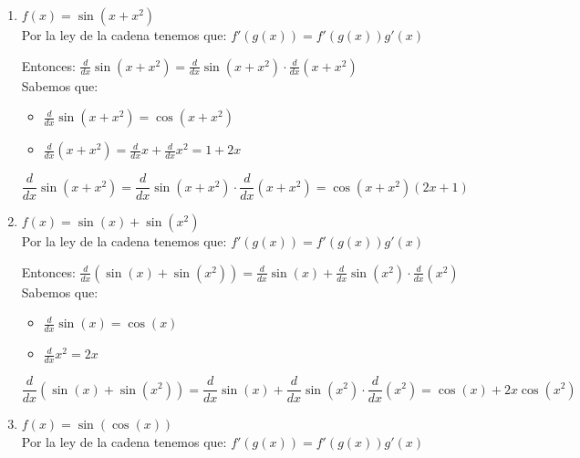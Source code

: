 \documentclass[12pt]{article}
\begin{document}
\begin{enumerate}[\hspace{9px} a)]
    \item \(f(x) = \sin(x+x^2)\)\\

        Por la ley de la cadena tenemos que: \(f'(g(x))=f'(g(x))g'(x)\)\medskip

        Entonces: \quad \(\displaystyle\frac{d}{dx}\sin(x+x^2)=\displaystyle\frac{d}{dx}\sin(x+x^2)\cdot\displaystyle\frac{d}{dx}(x+x^2)\)\\

        Sabemos que:
        \begin{itemize}
            \item \(\displaystyle\frac{d}{dx}\sin(x+x^2)=\cos(x+x^2)\)
            \item \(\displaystyle\frac{d}{dx}(x+x^2)=\frac{d}{dx}x + \frac{d}{dx}x^2=1+2x\)
        \end{itemize}

        \[\displaystyle\frac{d}{dx}\sin(x+x^2)=\displaystyle\frac{d}{dx}\sin(x+x^2)\cdot\displaystyle\frac{d}{dx}(x+x^2)=\cos(x+x^2)(2x+1)\]
    \item \(f(x) = \sin(x) + \sin(x^2)\)\\

        Por la ley de la cadena tenemos que: \(f'(g(x))=f'(g(x))g'(x)\)\medskip

        Entonces: \quad \(\displaystyle\frac{d}{dx}(\sin(x)+\sin(x^2))=\displaystyle\frac{d}{dx}\sin(x)+\frac{d}{dx}\sin(x^2)\cdot\frac{d}{dx}(x^2)\)\\

        Sabemos que:
        \begin{itemize}
            \item \(\displaystyle\frac{d}{dx}\sin(x)=\cos(x)\)
            \item \(\displaystyle\frac{d}{dx}x^2=2x\)
        \end{itemize}

        \begin{equation*}
            \displaystyle\frac{d}{dx}(\sin(x)+\sin(x^2))=\displaystyle\frac{d}{dx}\sin(x)+\frac{d}{dx}\sin(x^2)\cdot\frac{d}{dx}(x^2)=\cos(x)+2x\cos(x^2)
        \end{equation*}
    \item \(f(x) = \sin(\cos(x))\)\\

        Por la ley de la cadena tenemos que: \(f'(g(x))=f'(g(x))g'(x)\)\medskip


\end{enumerate}
\end{document}
